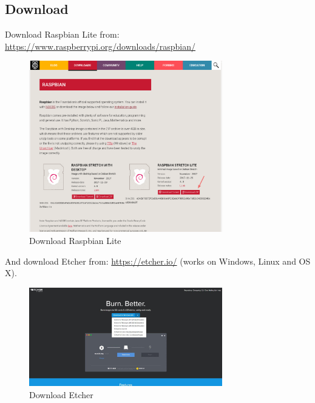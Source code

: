 \documentclass[11pt]{report}
\begin{document}
		\subsection{Download}
			Download Raspbian Lite from: 
			\href{https://www.raspberrypi.org/downloads/raspbian/}{https://www.raspberrypi.org/downloads/raspbian/}
			\begin{figure}[ht]
				\centering
				\includegraphics[width=0.75\textwidth]{images/pi/download_raspbian.png} 
				\caption{Download Raspbian Lite}
			\end{figure}
			\newpage
		And download Etcher from: \href{https://etcher.io/}{https://etcher.io/} (works on Windows, Linux and OS X).

			\begin{figure}[ht]
				\centering
				\includegraphics[width=0.75\textwidth]{images/pi/install_etcher_1.jpg} 
				\caption{Download Etcher}
			\end{figure}
\end{document}
